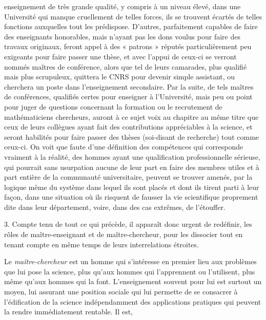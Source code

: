 \documentclass[11pt,a4paper]{article}
\begin{document}
enseignement de très grande qualité, y compris à un niveau élevé, dans une
Université qui manque cruellement de telles forces, ils se trouvent écartés de telles
fonctions auxquelles tout les prédispose. D'autres, parfaitement capables de
faire des enseignants honorables, mais n'ayant pas les dons voulus pour faire
des travaux originaux, feront appel à des « patrons » réputés particulièrement
peu exigeants pour faire passer une thèse, et avec l'appui de ceux-ci se
verront nommés maîtres de conférence, alors que tel de leurs camarades, plus
qualifié mais plus scrupuleux, quittera le CNRS pour devenir simple assistant,
ou cherchera un poste dans l'enseignement secondaire. Par la suite, de tels
maîtres de conférences, qualifiés certes pour enseigner à l'Université, mais
peu ou point pour juger de questions concernant la formation ou le recrutement
de mathématiciens chercheurs, auront à ce sujet voix au chapitre au même
titre que ceux de leurs collègues ayant fait des contributions appréciables
à la science, et seront habilités pour faire passer des thèses (soi-disant de
recherche) tout comme ceux-ci. On voit que faute d'une définition des
compétences qui corresponde vraiment à la réalité, des hommes ayant une
qualification professionnelle sérieuse, qui pourrait sans usurpation aucune de leur
part en faire des membres utiles et à part entière de la communauté
universitaire, peuvent se trouver amenés, par la logique même du système dans
lequel ils sont placés et dont ils tirent parti à leur façon, dans une
situation où ils risquent de fausser la vie scientifique proprement dite
dans leur département, voire, dans des cas extrêmes, de l'étouffer.

3. Compte tenu de tout ce qui précède, il apparaît donc urgent de redéfinir,
les rôles de maître-enseignant et de maître-chercheur, pour les dissocier
tout en tenant compte en même temps de leurs interrelations étroites.

Le \emph{maître-chercheur} est un homme qui s'intéresse en premier lieu
aux problèmes que lui pose la science, plus qu'aux hommes qui l'apprennent
ou l'utilisent, plus même qu'aux hommes qui la font. L'enseignement souvent
pour lui est surtout un moyen, lui assurant une position sociale qui lui
permette de se consacrer à l'édification de la science indépendamment des
applications pratiques qui peuvent la rendre immédiatement rentable. Il est,
\end{document}
